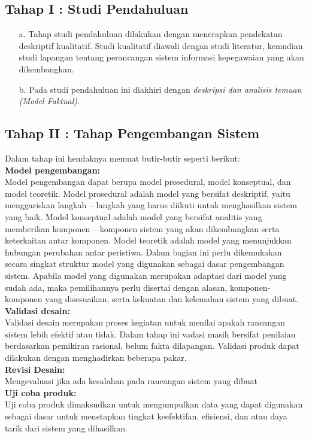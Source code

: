 \documentclass{jtetiproposalskripsi}
\begin{document}
\subsection{Tahap I : Studi Pendahuluan}
\begin{itemize}
\item[a.] Tahap studi pendahuluan dilakukan dengan menerapkan pendekatan deskriptif kualitatif. Studi kualitatif diawali dengan studi literatur, kemudian studi lapangan tentang perancangan sistem informasi kepegawaian yang akan dikembangkan.
\item[b.] Pada studi pendahuluan ini diakhiri dengan \emph{deskripsi dan analisis temuan (Model Faktual).}
\end{itemize}
\subsection{Tahap II : Tahap Pengembangan Sistem}
Dalam tahap ini  hendaknya memuat butir-butir seperti berikut:\\
\textbf{Model pengembangan:}\\
Model pengembangan dapat berupa model prosedural, model konseptual, dan model teoretik. Model prosedural adalah model yang bersifat deskriptif, yaitu menggariskan langkah – langkah yang harus diikuti untuk menghasilkan sistem yang baik. Model konseptual adalah model yang bersifat analitis yang memberikan komponen – komponen sistem yang akan dikembangkan serta keterkaitan antar komponen. Model teoretik adalah model yang menunjukkan hubungan perubahan antar peristiwa. Dalam bagian ini perlu  dikemukakan secara  singkat  struktur  model yang digunakan sebagai dasar pengembangan sistem. Apabila model yang digunakan merupakan adaptasi dari model yang sudah ada, maka pemilihannya perlu disertai dengan alasan, komponen-komponen yang disesuaikan, serta kekuatan dan kelemahan sistem yang dibuat.\\
\textbf{Validasi desain:}\\
Validasi desain merupakan proses kegiatan untuk menilai apakah rancangan sistem lebih efektif atau tidak. Dalam tahap ini vadasi masih bersifat penilaian berdasarkan pemikiran rasional, belum fakta dilapangan. Validasi produk dapat dilakukan dengan menghadirkan beberapa pakar.\\
\textbf{Revisi Desain:}\\
Mengevaluasi jika ada kesalahan pada rancangan sistem yang dibuat\\
\textbf{Uji coba produk:}\\
Uji coba produk dimaksudkan untuk mengumpulkan data yang dapat digunakan sebagai dasar untuk menetapkan tingkat keefektifan, efisiensi, dan atau daya tarik dari sistem yang dihasilkan.\\
\end{document}

